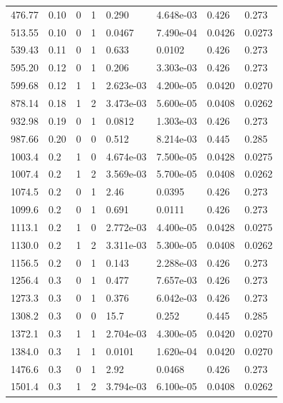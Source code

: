 \documentclass[preview]{standalone}
\begin{document}
{{\begin{tabular}{L{1.2cm}C{1.2cm} C{0.3cm}C{0.5cm} C{1.4cm}C{1.4cm} C{1.4cm}C{1.4cm}}
  476.77  &  0.10  & 0     &  1 &  0.290  & 4.648e-03  & 0.426 &  0.273   \\ 
  513.55  &  0.10  & 0     &  1 &  0.0467  & 7.490e-04  & 0.0426 &  0.0273   \\ 
  539.43  &  0.11  & 0     &  1 &  0.633  & 0.0102  & 0.426 &  0.273   \\ 
  595.20  &  0.12  & 0     &  1 &  0.206  & 3.303e-03  & 0.426 &  0.273   \\ 
  599.68  &  0.12  & 1     &  1 &  2.623e-03  & 4.200e-05  & 0.0420 &  0.0270   \\ 
  878.14  &  0.18  & 1     &  2 &  3.473e-03  & 5.600e-05  & 0.0408 &  0.0262   \\ 
  932.98  &  0.19  & 0     &  1 &  0.0812  & 1.303e-03  & 0.426 &  0.273   \\ 
  987.66  &  0.20  & 0     &  0 &  0.512  & 8.214e-03  & 0.445 &  0.285   \\ 
  1003.4  &   0.2  & 1     &  0 &  4.674e-03  & 7.500e-05  & 0.0428 &  0.0275   \\ 
  1007.4  &   0.2  & 1     &  2 &  3.569e-03  & 5.700e-05  & 0.0408 &  0.0262   \\ 
  1074.5  &   0.2  & 0     &  1 &  2.46  & 0.0395  & 0.426 &  0.273   \\ 
  1099.6  &   0.2  & 0     &  1 &  0.691  & 0.0111  & 0.426 &  0.273   \\ 
  1113.1  &   0.2  & 1     &  0 &  2.772e-03  & 4.400e-05  & 0.0428 &  0.0275   \\ 
  1130.0  &   0.2  & 1     &  2 &  3.311e-03  & 5.300e-05  & 0.0408 &  0.0262   \\ 
  1156.5  &   0.2  & 0     &  1 &  0.143  & 2.288e-03  & 0.426 &  0.273   \\ 
  1256.4  &   0.3  & 0     &  1 &  0.477  & 7.657e-03  & 0.426 &  0.273   \\ 
  1273.3  &   0.3  & 0     &  1 &  0.376  & 6.042e-03  & 0.426 &  0.273   \\ 
  1308.2  &   0.3  & 0     &  0 &  15.7  & 0.252  & 0.445 &  0.285   \\ 
  1372.1  &   0.3  & 1     &  1 &  2.704e-03  & 4.300e-05  & 0.0420 &  0.0270   \\ 
  1384.0  &   0.3  & 1     &  1 &  0.0101  & 1.620e-04  & 0.0420 &  0.0270   \\ 
  1476.6  &   0.3  & 0     &  1 &  2.92  & 0.0468  & 0.426 &  0.273   \\ 
  1501.4  &   0.3  & 1     &  2 &  3.794e-03  & 6.100e-05  & 0.0408 &  0.0262   \\ 

\end{tabular}}}
\end{document}
